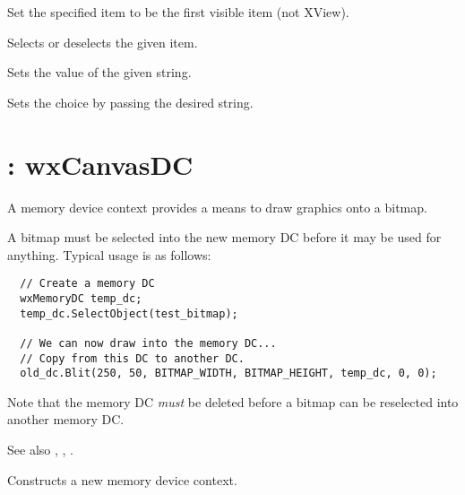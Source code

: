 


Set the specified item to be the first visible item (not XView).



Selects or deselects the given item.



Sets the value of the given string.



Sets the choice by passing the desired string.

\section{: wxCanvasDC}\label{wxmemorydc}

A memory device context provides a means to draw graphics onto a bitmap.

A bitmap must be selected into the new memory DC before it may be used
for anything.  Typical usage is as follows:

\begin{verbatim}
  // Create a memory DC
  wxMemoryDC temp_dc;
  temp_dc.SelectObject(test_bitmap);

  // We can now draw into the memory DC...
  // Copy from this DC to another DC.
  old_dc.Blit(250, 50, BITMAP_WIDTH, BITMAP_HEIGHT, temp_dc, 0, 0);
\end{verbatim}

Note that the memory DC {\it must} be deleted before a bitmap
can be reselected into another memory DC.

See also , , .



Constructs a new memory device context.

